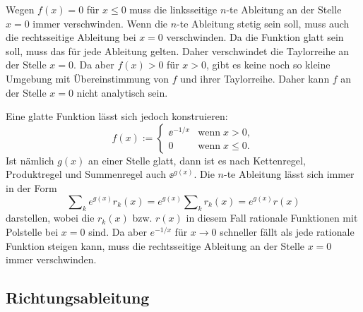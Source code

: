 \begin{Beweis}
Wegen $f(x)=0$ für $x\le 0$ muss die linksseitige $n$-te Ableitung
an der Stelle $x=0$ immer verschwinden. Wenn die $n$-te Ableitung
stetig sein soll, muss auch die rechtsseitige Ableitung bei $x=0$
verschwinden. Da die Funktion glatt sein soll, muss das für jede
Ableitung gelten. Daher verschwindet die Taylorreihe an der Stelle
$x=0$. Da aber $f(x)>0$ für $x>0$, gibt es keine noch so kleine
Umgebung mit Übereinstimmung von $f$ und ihrer Taylorreihe.
Daher kann $f$ an der Stelle $x=0$ nicht analytisch sein.

Eine glatte Funktion lässt sich jedoch konstruieren:
\[f(x):=\begin{cases}
\ee^{-1/x}&\text{wenn}\;x>0,\\
0&\text{wenn}\;x\le 0.
\end{cases}\]
Ist nämlich $g(x)$ an einer Stelle glatt, dann ist
es nach Kettenregel, Produktregel und Summenregel auch $\ee^{g(x)}$.
Die $n$-te Ableitung lässt sich immer in der Form%
\[\sum\nolimits_k e^{g(x)}{r_k(x)}
= e^{g(x)}\sum\nolimits_k r_k(x) = e^{g(x)}r(x)\]
darstellen, wobei die $r_k(x)$ bzw. $r(x)$ in diesem Fall rationale
Funktionen mit Polstelle bei $x=0$ sind. Da aber $e^{-1/x}$ für
$x\to 0$ schneller fällt als jede rationale Funktion steigen kann,
muss die rechtsseitige Ableitung an der Stelle $x=0$ immer
verschwinden.\;\qedsymbol
\end{Beweis}

\subsection{Richtungsableitung}

